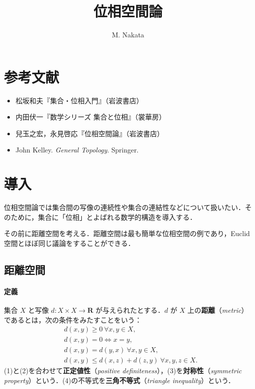 \documentclass[10pt,b5paper,pandoc]{bxjsarticle}
\title{位相空間論}
\author{M. Nakata}
\date{}
\providecommand{\tightlist}{%
  \setlength{\itemsep}{0pt}\setlength{\parskip}{0pt}}
\let\oldparagraph\paragraph
\renewcommand{\paragraph}[1]{\oldparagraph{#1}\mbox{}}
\begin{document}
\maketitle

{
\setcounter{tocdepth}{3}
\tableofcontents
}
\hypertarget{ux53c2ux8003ux6587ux732e}{%
\section{参考文献}\label{ux53c2ux8003ux6587ux732e}}

\begin{itemize}
\tightlist
\item
  松坂和夫『集合・位相入門』（岩波書店）
\item
  内田伏一『数学シリーズ 集合と位相』（裳華房）
\item
  兒玉之宏，永見啓応『位相空間論』（岩波書店）
\item
  John Kelley. \emph{General Topology}. Springer.
\end{itemize}

\hypertarget{topology-introduction}{%
\section{導入}\label{topology-introduction}}

位相空間論では集合間の写像の連続性や集合の連結性などについて扱いたい．そのために，集合に「位相」とよばれる数学的構造を導入する．

その前に距離空間を考える．距離空間は最も簡単な位相空間の例であり，Euclid空間とほぼ同じ議論をすることができる．

\hypertarget{metric-space}{%
\subsection{距離空間}\label{metric-space}}

\hypertarget{metric-space-def}{%
\paragraph{定義}\label{metric-space-def}}

集合 \(X\) と写像 \(d \colon X \times X \to \boldsymbol{R}\)
が与えられたとする．\(d\) が \(X\)
上の\textbf{距離}（\emph{metric}）であるとは，次の条件をみたすことをいう：
\begin{align}
& d(x, y) \ge 0 \ \forall x, y \in X,\\
& d(x, y) = 0 \Longleftrightarrow x = y,\\
& d(x, y) = d(y, x) \ \forall x, y \in X,\\
& d(x, y) \le d(x, z) + d(z, y) \ \forall x, y, z \in X.
\end{align} (1)と(2)を合わせて\textbf{正定値性}（\emph{positive
definiteness}），(3)を\textbf{対称性}（\emph{symmetric
property}）という．(4)の不等式を\textbf{三角不等式}（\emph{triangle
inequality}）という．
\end{document}
